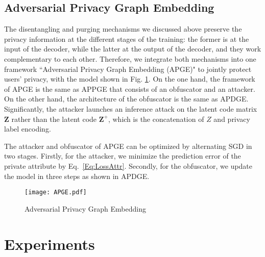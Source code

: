 \documentclass{article}
\begin{document}
\subsection{Adversarial Privacy Graph Embedding}
The disentangling and purging mechanisms we discussed above preserve the privacy information at the different stages of the training: the former is at the input of the decoder, while the latter at the output of the decoder, and they work complementary to each other. Therefore, we integrate both mechanisms into one framework ``Adversarial Privacy Graph Embedding (APGE)" to jointly protect users' privacy, with the model shown in Fig. \ref{Fig:APDGE}. On the one hand, the framework of APGE is the same as APPGE that consists of an obfuscator and an attacker. On the other hand, the architecture of the obfuscator is the same as APDGE. Significantly, the attacker launches an inference attack on the latent code matrix $\mathbf{Z}$ rather than the latent code $\mathbf{Z^+}$, which is the concatenation of $Z$ and privacy label encoding.

The attacker and obfuscator of APGE can be optimized by alternating SGD in two stages. Firstly, for the attacker, we minimize the prediction error of the private attribute by Eq.~\ref{Eq:LossAttr}. Secondly, for the obfuscator, we update the model in three steps as shown in APDGE.


\begin{figure}
  \centering
  \texttt{[image: APGE.pdf]}
  \caption{Adversarial Privacy Graph Embedding}
  \label{Fig:APDGE}
\end{figure}



\section{Experiments}
\end{document}
